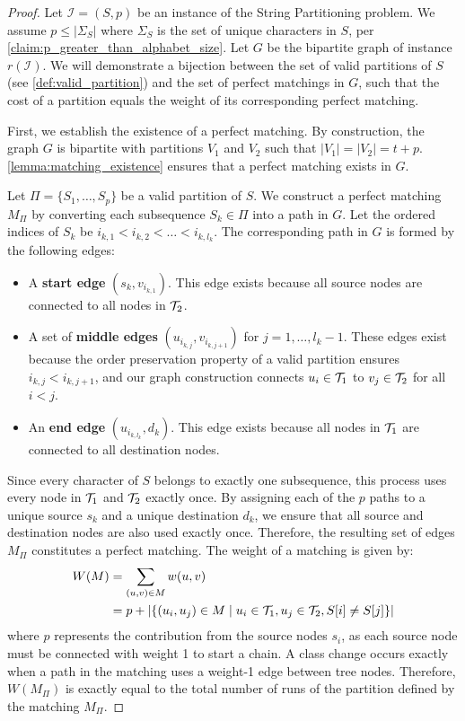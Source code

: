\begin{proof}
    Let $\mathcal{I} = (S, p)$ be an instance of the String Partitioning problem. We assume $p \leq |\Sigma_S|$ where $\Sigma_S$ is the set of unique characters in $S$, per \cref{claim:p_greater_than_alphabet_size}. Let $G$ be the bipartite graph of instance $r(\mathcal{I})$. We will demonstrate a bijection between the set of valid partitions of $S$ (see \cref{def:valid_partition}) and the set of perfect matchings in $G$, such that the cost of a partition equals the weight of its corresponding perfect matching.

    First, we establish the existence of a perfect matching. By construction, the graph $G$ is bipartite with partitions $V_1$ and $V_2$ such that $|V_1| = |V_2| = t+p$. \cref{lemma:matching_existence} ensures that a perfect matching exists in $G$.

    Let $\Pi = \{S_1, \dots, S_p\}$ be a valid partition of $S$. We construct a perfect matching $M_\Pi$ by converting each subsequence $S_k \in \Pi$ into a path in $G$. Let the ordered indices of $S_k$ be $i_{k,1} < i_{k,2} < \dots < i_{k,l_k}$. The corresponding path in $G$ is formed by the following edges:
    \begin{itemize}[leftmargin=25pt]
        \item A \textbf{start edge} $(s_k, v_{i_{k,1}})$. This edge exists because all source nodes are connected to all nodes in $\mathcal{T}_{2}$.
        \item A set of \textbf{middle edges} $(u_{i_{k,j}}, v_{i_{k,j+1}})$ for $j=1, \dots, l_k-1$. These edges exist because the order preservation property of a valid partition ensures $i_{k,j} < i_{k,j+1}$, and our graph construction connects $u_i \in \mathcal{T}_{1}$ to $v_j \in \mathcal{T}_{2}$ for all $i < j$.
        \item An \textbf{end edge} $(u_{i_{k,l_k}}, d_k)$. This edge exists because all nodes in $\mathcal{T}_{1}$ are connected to all destination nodes.
    \end{itemize}
    Since every character of $S$ belongs to exactly one subsequence, this process uses every node in $\mathcal{T}_{1}$ and $\mathcal{T}_{2}$ exactly once. By assigning each of the $p$ paths to a unique source $s_k$ and a unique destination $d_k$, we ensure that all source and destination nodes are also used exactly once. Therefore, the resulting set of edges $M_\Pi$ constitutes a perfect matching. The weight of a matching is given by:
    \begin{align*}
        W(M) &= \sum_{(u,v) \in M} w(u,v) \\
        &= p + |\{ (u_i, u_j) \in M \mid u_i \in \mathcal{T}_{1}, u_j \in \mathcal{T}_{2}, S[i] \neq S[j] \}|
    \end{align*}
    where $p$ represents the contribution from the source nodes $s_i$, as each source node must be connected with weight 1 to start a chain. A class change occurs exactly when a path in the matching uses a weight-1 edge between tree nodes.
    Therefore, $W(M_\Pi)$ is exactly equal to the total number of runs of the partition defined by the matching $M_\Pi$.


\end{proof}
